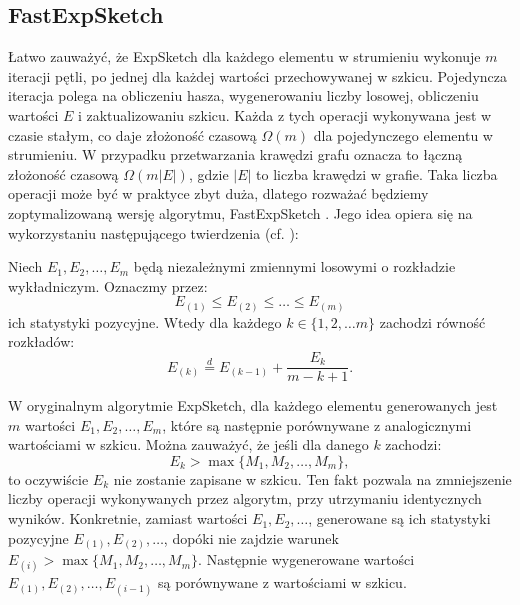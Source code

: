     
    
\subsection{FastExpSketch}
    Łatwo zauważyć, że ExpSketch dla każdego elementu w strumieniu wykonuje $m$ iteracji pętli, po jednej dla każdej wartości przechowywanej w szkicu. Pojedyncza iteracja polega na obliczeniu hasza, wygenerowaniu liczby losowej, obliczeniu wartości $E$ i zaktualizowaniu szkicu. Każda z tych operacji wykonywana jest w czasie stałym, co daje złożoność czasową $\Omega(m)$ dla pojedynczego elementu w strumieniu. W przypadku przetwarzania krawędzi grafu oznacza to łączną złożoność czasową $\Omega(m|E|)$, gdzie $|E|$ to liczba krawędzi w grafie. Taka liczba operacji może być w praktyce zbyt duża, dlatego rozważać będziemy zoptymalizowaną wersję algorytmu, FastExpSketch \cite{Lemiesz_2023}. Jego idea opiera się na wykorzystaniu następującego twierdzenia (cf. \cite{Devroye_1986a}):
    \begin{twierdzenie}
        \label{theo:orderStatsExp}        
        Niech $E_1, E_2, \dots, E_m$ będą niezależnymi zmiennymi losowymi o rozkładzie wykładniczym. Oznaczmy przez:
        \[
            E_{(1)} \leq E_{(2)} \leq \dots \leq E_{(m)}  
        \]
        ich statystyki pozycyjne. Wtedy dla każdego $k \in \{1,2, \dots m\}$ zachodzi równość rozkładów: 
        \[
            E_{(k)} \stackrel{d}{=} E_{(k - 1)} + \frac{E_k}{m - k + 1}.       
        \]
    \end{twierdzenie}

    W oryginalnym algorytmie ExpSketch, dla każdego elementu generowanych jest $m$ wartości $E_{1}, E_{2}, \dots, E_{m}$, które są następnie porównywane z analogicznymi wartościami w szkicu. Można zauważyć, że jeśli dla danego $k$ zachodzi:
    \[
        E_{k} > \max{\{M_1, M_2, \dots, M_m\}},     
    \]
    to oczywiście $E_{k}$ nie zostanie zapisane w szkicu. Ten fakt pozwala na zmniejszenie liczby operacji wykonywanych przez algorytm, przy utrzymaniu identycznych wyników. Konkretnie, zamiast wartości $E_{1}, E_{2}, \dots$, generowane są ich statystyki pozycyjne $E_{(1)}, E_{(2)}, \dots$, dopóki nie zajdzie warunek $E_{(i)} > \max{\{M_1, M_2, \dots, M_m\}}$. Następnie wygenerowane wartości $E_{(1)}, E_{(2)}, \dots, E_{(i - 1)}$ są porównywane z wartościami w szkicu. 
    
